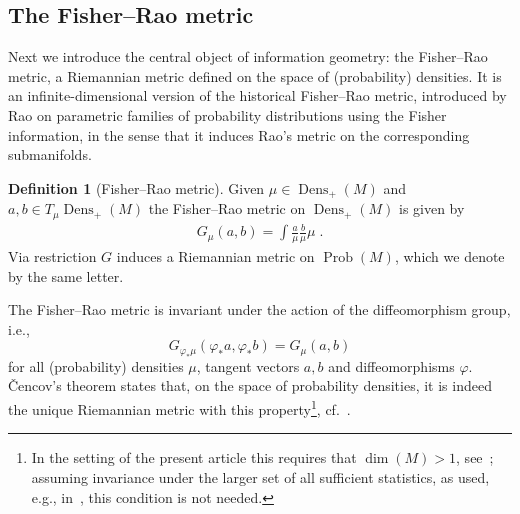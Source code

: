 \documentclass[11pt,reqno]{amsart}
\theoremstyle{definition}
\newtheorem{definition}[theorem]{Definition}
\newcommand{\Prob}{\operatorname{Prob}(M)}
\newcommand{\Dens}{\operatorname{Dens}_+(M)}
\newcommand{\GFR}{G}
\begin{document}
\subsection{The Fisher--Rao metric}
Next we introduce the central object of information geometry: the Fisher--Rao metric, a Riemannian metric defined on the space of (probability) densities. It is an infinite-dimensional version of the historical Fisher--Rao metric, introduced by Rao \cite{rao1945} on parametric families of probability distributions using the Fisher information, in the sense that it induces Rao's metric on the corresponding submanifolds.
\begin{definition}[Fisher--Rao metric]
Given $\mu\in \Dens$ and $a,b\in T_\mu\Dens$ the Fisher--Rao metric on $\Dens$ is given by
\begin{align}\label{Fisher--Rao}
\GFR_{\mu}(a,b)=\int \frac{a}{\mu} \frac{b}{\mu}\mu\;.
\end{align}
Via restriction $\GFR$ induces a Riemannian metric on $\Prob$, which we denote by the same letter.
\end{definition}
The Fisher--Rao metric is invariant under the action of the diffeomorphism group, i.e.,
$$G_{\varphi_*\mu}(\varphi_*a,\varphi_*b)=G_{\mu}(a,b)$$ for all (probability) densities $\mu$, tangent vectors $a,b$ and diffeomorphisms $\varphi$. 
\v{C}encov's theorem states that, on the space of probability densities, it is indeed the unique Riemannian metric with this property\footnote{In the setting of the present article this requires that $\operatorname{dim}(M)>1$, see~\cite{bauer2016uniqueness}; assuming invariance under the larger set of all sufficient statistics, as used, e.g., in~\cite{ay2015information}, this condition is not needed.}, cf.~\cite{cencov1982,ay2015information,bauer2016uniqueness}. 
\end{document}
